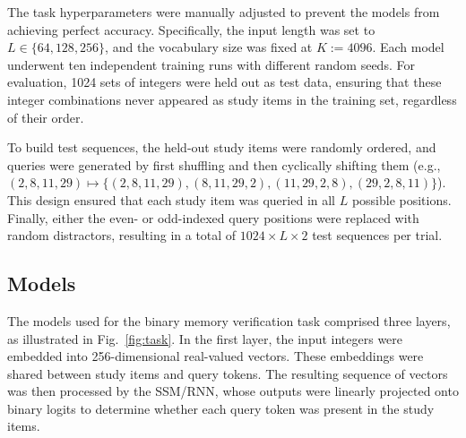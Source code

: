 \documentclass[10pt,letterpaper]{article}
\begin{document}
The task hyperparameters were manually adjusted to prevent the models from achieving perfect accuracy.
Specifically, the input length was set to $L \in \{64, 128, 256\}$, and the vocabulary size was fixed at $K:=4096$.
% 
Each model underwent ten independent training runs with different random seeds.
For evaluation, 1024 sets of integers were held out as test data, ensuring that these integer combinations never appeared as study items in the training set, regardless of their order.

To build test sequences, the held-out study items were randomly ordered, and queries were generated by first shuffling and then cyclically shifting them (e.g., $(2,8,11,29) \mapsto \{ (2,8,11,29), (8,11,29,2), (11,29,2,8), (29,2,8,11) \}$).
This design ensured that each study item was queried in all $L$ possible positions.
Finally, either the even- or odd-indexed query positions were replaced with random distractors, resulting in a total of $1024 \times L \times 2$ test sequences per trial.


\subsection{Models}

The models used for the binary memory verification task comprised three layers, as illustrated in Fig.~\ref{fig:task}.
In the first layer, the input integers were embedded into 256-dimensional real-valued vectors.
These embeddings were shared between study items and query tokens.
The resulting sequence of vectors was then processed by the SSM/RNN, whose outputs were linearly projected onto binary logits to determine whether each query token was present in the study items.
\end{document}
